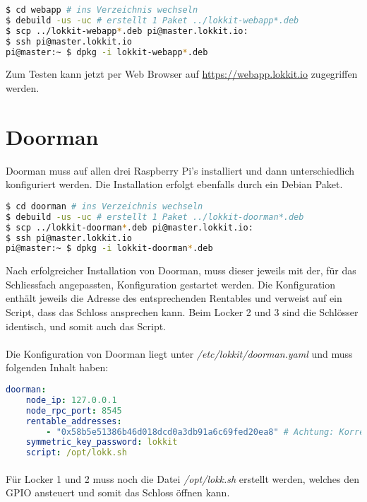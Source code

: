 \begin{lstlisting}[language=bash]
$ cd webapp # ins Verzeichnis wechseln
$ debuild -us -uc # erstellt 1 Paket ../lokkit-webapp*.deb
$ scp ../lokkit-webapp*.deb pi@master.lokkit.io:
$ ssh pi@master.lokkit.io
pi@master:~ $ dpkg -i lokkit-webapp*.deb
\end{lstlisting}

Zum Testen kann jetzt per Web Browser auf \url{https://webapp.lokkit.io} zugegriffen werden.

\section{Doorman}
Doorman muss auf allen drei Raspberry Pi's installiert und dann unterschiedlich konfiguriert werden. Die Installation erfolgt ebenfalls durch ein Debian Paket.

\begin{lstlisting}[language=bash]
$ cd doorman # ins Verzeichnis wechseln
$ debuild -us -uc # erstellt 1 Paket ../lokkit-doorman*.deb
$ scp ../lokkit-doorman*.deb pi@master.lokkit.io:
$ ssh pi@master.lokkit.io
pi@master:~ $ dpkg -i lokkit-doorman*.deb
\end{lstlisting}

Nach erfolgreicher Installation von Doorman, muss dieser jeweils mit der, für das Schliessfach angepassten, Konfiguration gestartet werden. Die Konfiguration enthält jeweils die Adresse des entsprechenden Rentables und verweist auf ein Script, dass das Schloss ansprechen kann. Beim Locker 2 und 3 sind die Schlösser identisch, und somit auch das Script. 

\paragraph{}
Die Konfiguration von Doorman liegt unter \emph{/etc/lokkit/doorman.yaml} und muss folgenden Inhalt haben:

\begin{lstlisting}[language=yaml,caption={Doorman-Konfiguration für Locker 2 und 3}]
doorman:
    node_ip: 127.0.0.1
    node_rpc_port: 8545
    rentable_addresses:
        - "0x58b5e51386b46d018dcd0a3db91a6c69fed20ea8" # Achtung: Korrekte Adresse eintragen
    symmetric_key_password: lokkit
    script: /opt/lokk.sh
\end{lstlisting} 

\paragraph{} 
Für Locker 1 und 2 muss noch die Datei \emph{/opt/lokk.sh} erstellt werden, welches den GPIO ansteuert und somit das Schloss öffnen kann.

